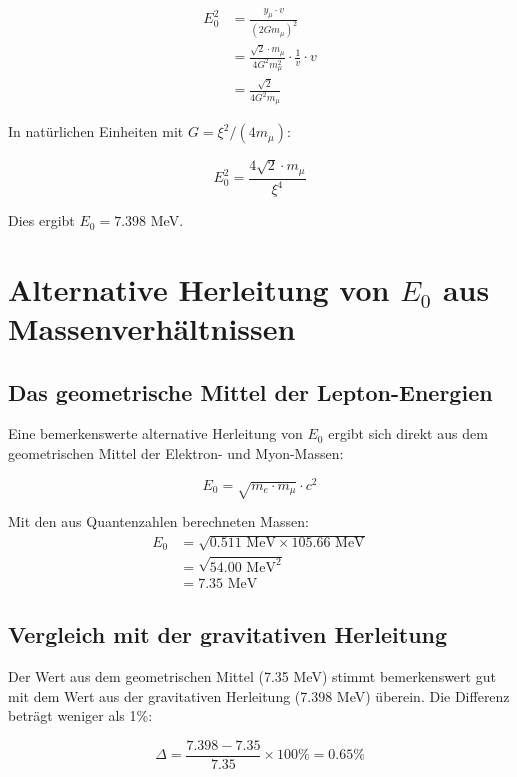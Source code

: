 \documentclass[12pt,a4paper]{article}
\theoremstyle{definition}
\begin{document}
	\begin{align}
		E_0^2 &= \frac{y_\mu \cdot v}{(2Gm_\mu)^2}\\
		&= \frac{\sqrt{2} \cdot m_\mu}{4G^2 m_\mu^2} \cdot \frac{1}{v} \cdot v\\
		&= \frac{\sqrt{2}}{4G^2 m_\mu}
	\end{align}
	
	In nat\"urlichen Einheiten mit $G = \xi^2/(4m_\mu)$:
	
	\begin{equation}
		E_0^2 = \frac{4\sqrt{2} \cdot m_\mu}{\xi^4}
	\end{equation}
	
	Dies ergibt $E_0 = 7.398$ MeV.
	
	\section{Alternative Herleitung von $E_0$ aus Massenverh\"altnissen}
	
	\subsection{Das geometrische Mittel der Lepton-Energien}
	
	Eine bemerkenswerte alternative Herleitung von $E_0$ ergibt sich direkt aus dem geometrischen Mittel der Elektron- und Myon-Massen:
	
	\begin{equation}
		E_0 = \sqrt{m_e \cdot m_\mu} \cdot c^2
	\end{equation}
	
	Mit den aus Quantenzahlen berechneten Massen:
	\begin{align}
		E_0 &= \sqrt{0.511 \text{ MeV} \times 105.66 \text{ MeV}}\\
		&= \sqrt{54.00 \text{ MeV}^2}\\
		&= 7.35 \text{ MeV}
	\end{align}
	
	\subsection{Vergleich mit der gravitativen Herleitung}
	
	Der Wert aus dem geometrischen Mittel (7.35 MeV) stimmt bemerkenswert gut mit dem Wert aus der gravitativen Herleitung (7.398 MeV) \"uberein. Die Differenz betr\"agt weniger als 1\%:
	
	\begin{equation}
		\Delta = \frac{7.398 - 7.35}{7.35} \times 100\% = 0.65\%
	\end{equation}
	
\end{document}
